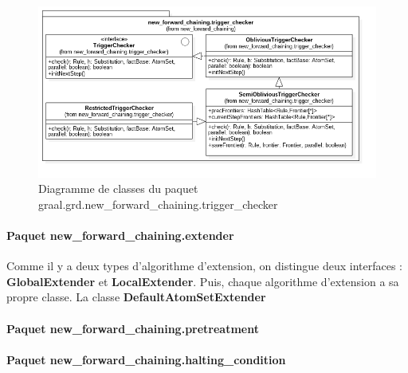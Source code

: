        \begin{figure}[h]
        \centering
        \includegraphics[width=\textwidth]{pictures/new_forward_chaining-trigger_checker.png}
        \vspace{-30pt}
        \caption{Diagramme de classes du paquet graal.grd.new\_forward\_chaining.trigger\_checker}
        \label{fig:new_forward_chaining.trigger_checker}
        \end{figure}
       
       \paragraph{Paquet new\_forward\_chaining.extender}
       
       Comme il y a deux types d'algorithme d'extension, on distingue deux interfaces : \textbf{GlobalExtender} et \textbf{LocalExtender}. Puis, chaque algorithme d'extension a sa propre classe. La classe \textbf{DefaultAtomSetExtender}
       
       \paragraph{Paquet new\_forward\_chaining.pretreatment}
       \paragraph{Paquet new\_forward\_chaining.halting\_condition}
       
       

